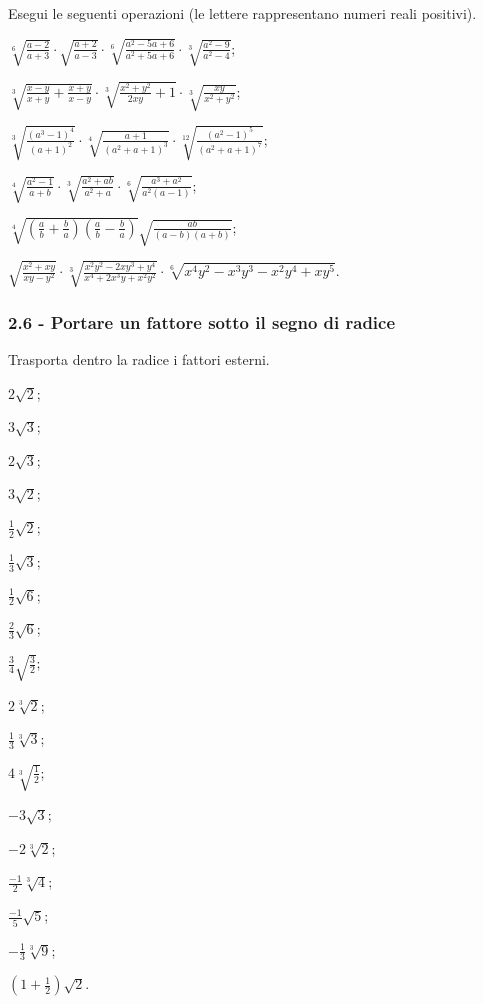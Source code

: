 \begin{esercizio}[\Ast]
 \label{ese:2.47}
Esegui le seguenti operazioni (le lettere rappresentano numeri reali positivi).
 \begin{enumeratea}
 \item $\sqrt[6]{\frac{a-2}{a+3}}\cdot\sqrt{\frac{a+2}{a-3}}\cdot\sqrt[6]{\frac{a^2-5a+6}{a^2+5a+6}}\cdot\sqrt[3]{\frac{a^2-9}{a^2-4}}$;
 \item $\sqrt[3]{\frac{x-y}{x+y}+\frac{x+y}{x-y}}\cdot\sqrt[3]{\frac{x^2+y^2}{2xy}+1}\cdot\sqrt[3]{\frac{xy}{x^2+y^2}}$;
 \item $\sqrt[3]{\frac{(a^3-1)^4}{(a+1)^2}}\cdot\sqrt[4]{\frac{a+1}{(a^2+a+1)^3}}\cdot\sqrt[12]{\frac{(a^2-1)^5}{(a^2+a+1)^7}}$;
 \item $\sqrt[4]{\frac{a^2-1}{a+b}}\cdot\sqrt[3]{\frac{a^2+ab}{a^2+a}}\cdot\sqrt[6]{\frac{a^3+a^2}{a^2(a-1)}}$;
 \item $\sqrt[4]{\left(\frac{a}{b}+\frac{b}{a}\right)\left(\frac{a}{b}-\frac{b}{a}\right)}\sqrt{\frac{ab}{(a-b)(a+b)}}$;
 \item $\sqrt{\frac{x^2+xy}{xy-y^2}}\cdot\sqrt[3]{\frac{x^2y^2-2xy^3+y^4}{x^4+2x^3y+x^2y^2}}\cdot\sqrt[6]{x^4y^2-x^3y^3-x^2y^4+xy^5}$.
 \end{enumeratea}
\end{esercizio}

\subsubsection*{2.6 - Portare un fattore sotto il segno di radice}

\begin{esercizio}[\Ast]
 \label{ese:2.48}
Trasporta dentro la radice i fattori esterni.
 \begin{multicols}{4}
 \begin{enumeratea}
 \item $2\sqrt 2$;
 \item $3\sqrt 3$;
 \item $2\sqrt 3$;
 \item $3\sqrt 2$;
 \item $\frac 1 2\sqrt 2$;
 \item $\frac 1 3\sqrt 3$;
 \item $\frac 1 2\sqrt 6$;
 \item $\frac 2 3\sqrt 6$;
 \item $\frac 3 4\sqrt{\frac 3 2}$;
 \item $2\sqrt[3]2$;
 \item $\frac 1 3\sqrt[3]3$;
 \item $4\sqrt[3]{\frac 1 2}$;
 \item $-3\sqrt 3$;
 \item $-2\sqrt[3]2$;
 \item $\frac{-1} 2\sqrt[3]4$;
 \item $\frac{-1} 5\sqrt 5$;
 \item $-\frac 1 3\sqrt[3]9$;
 \item $\left(1+\frac 1 2\right)\sqrt 2$.
 \end{enumeratea}
 \end{multicols}
\end{esercizio}

